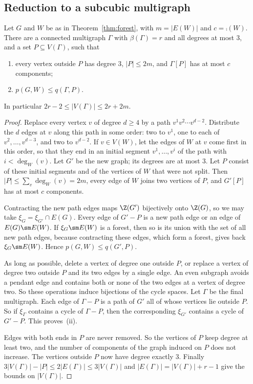 \subsection{Reduction to a subcubic multigraph}

\begin{lemma}\label{lem:reduce}
Let $G$ and $W$ be as in Theorem~\ref{thm:forest}, with $m=|E(W)|$ and $c=\comp(W)$. There are a
connected multigraph $\Gamma$ with $\beta(\Gamma)=r$ and all degrees at most $3$, and a set
$P\subseteq V(\Gamma)$, such that
\begin{enumerate}
\item[\textup{(i)}] every vertex outside $P$ has degree $3$, $|P|\le2m$, and $\Gamma[P]$ has at
most $c$ components;
\item[\textup{(ii)}] $p(G,W)\le q(\Gamma,P)$.
\end{enumerate}
In particular $2r-2\le|V(\Gamma)|\le2r+2m$.
\end{lemma}

\begin{proof}
 Replace every vertex $v$ of degree $d\ge4$ by a path $v^{1}v^{2}\cdots v^{d-2}$.
Distribute the $d$ edges at $v$ along this path in some order: two to $v^{1}$, one to each of
$v^{2},\dots,v^{d-3}$, and two to $v^{d-2}$. If $v\in V(W)$, let the edges of $W$ at $v$ come first
in this order, so that they end in an initial segment $v^{1},\dots,v^{i}$ of the path with
$i<\deg_W(v)$. Let $G'$ be the new graph; its degrees are at most $3$. Let $P$ consist of these
initial segments and of the vertices of $W$ that were not split. Then $|P|\le\sum_v\deg_W(v)=2m$,
every edge of $W$ joins two vertices of $P$, and $G'[P]$ has at most $c$ components.

Contracting the new path edges maps $\Z(G')$ bijectively onto $\Z(G)$, so we may take
$\xi_G=\xi_{G'}\cap E(G)$. Every edge of $G'-P$ is a new path edge or an edge of $E(G)\sm E(W)$. If
$\xi_G\sm E(W)$ is a forest, then so is its union with the set of all new path edges, because
contracting these edges, which form a forest, gives back $\xi_G\sm E(W)$. Hence
$p(G,W)\le q(G',P)$.

 As long as possible, delete a vertex of degree one outside $P$, or replace a vertex
of degree two outside $P$ and its two edges by a single edge. An even subgraph avoids a pendant edge
and contains both or none of the two edges at a vertex of degree two. So these operations induce
bijections of the cycle spaces. Let $\Gamma$ be the final multigraph. Each edge of $\Gamma-P$ is a
path of $G'$ all of whose vertices lie outside $P$. So if $\xi_\Gamma$ contains a cycle of
$\Gamma-P$, then the corresponding $\xi_{G'}$ contains a cycle of $G'-P$. This proves~(ii).

Edges with both ends in $P$ are never removed. So the vertices of $P$ keep degree at least two, and
the number of components of the graph induced on $P$ does not increase. The vertices outside $P$
now have degree exactly $3$. Finally $3|V(\Gamma)|-|P|\le2|E(\Gamma)|\le3|V(\Gamma)|$ and
$|E(\Gamma)|=|V(\Gamma)|+r-1$ give the bounds on $|V(\Gamma)|$.
\end{proof}

